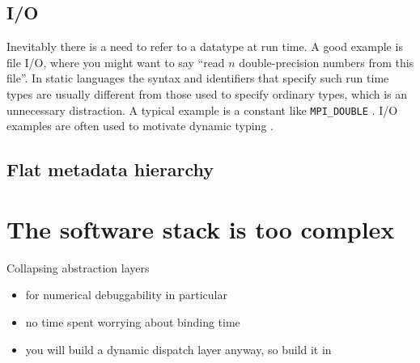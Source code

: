 {%




\subsection{I/O}

Inevitably there is a need to refer to a datatype at run time.
A good example is file I/O, where you might want to say ``read $n$ double-precision
numbers from this file''.
In static languages the syntax and identifiers that
specify such run time types are usually different from those used to specify
ordinary types, which is an unnecessary distraction.
A typical example is a constant like \texttt{MPI\_DOUBLE} \cite{snir1998mpi}.
I/O examples are often used to motivate dynamic typing \cite{Abadi:1991:DTS:103135.103138}.


\subsection{Flat metadata hierarchy}




\section{The software stack is too complex}

Collapsing abstraction layers

\begin{itemize}
\item for numerical debuggability in particular
\item no time spent worrying about binding time
\item you will build a dynamic dispatch layer anyway, so build it in
\end{itemize}

}
